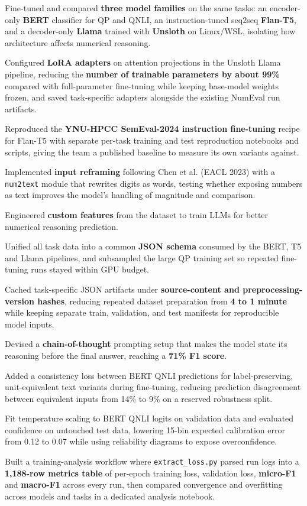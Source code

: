 \documentclass[letterpaper,11pt]{article}
\newcommand{\resumeItem}[1]{
  \item\small{
    {#1 \vspace{-2pt}}
  }
}
\begin{document}
        \resumeItem{Fine-tuned and compared \textbf{three model families} on the same tasks: an encoder-only \textbf{BERT} classifier for QP and QNLI, an instruction-tuned seq2seq \textbf{Flan-T5}, and a decoder-only \textbf{Llama} trained with \textbf{Unsloth} on Linux/WSL, isolating how architecture affects numerical reasoning.}
        \resumeItem{Configured \textbf{LoRA adapters} on attention projections in the Unsloth Llama pipeline, reducing the \textbf{number of trainable parameters by about 99\%} compared with full-parameter fine-tuning while keeping base-model weights frozen, and saved task-specific adapters alongside the existing NumEval run artifacts.}
        \resumeItem{Reproduced the \textbf{YNU-HPCC SemEval-2024 instruction fine-tuning} recipe for Flan-T5 with separate per-task training and test reproduction notebooks and scripts, giving the team a published baseline to measure its own variants against.}
        \resumeItem{Implemented \textbf{input reframing} following Chen et al. (EACL 2023) with a \texttt{num2text} module that rewrites digits as words, testing whether exposing numbers as text improves the model's handling of magnitude and comparison.}
        \resumeItem{Engineered \textbf{custom features} from the dataset to train LLMs for better numerical reasoning prediction.}
        \resumeItem{Unified all task data into a common \textbf{JSON schema} consumed by the BERT, T5 and Llama pipelines, and subsampled the large QP training set so repeated fine-tuning runs stayed within GPU budget.}
        \resumeItem{Cached task-specific JSON artifacts under \textbf{source-content and preprocessing-version hashes}, reducing repeated dataset preparation from \textbf{4 to 1 minute} while keeping separate train, validation, and test manifests for reproducible model inputs.}
        \resumeItem{Devised a \textbf{chain-of-thought} prompting setup that makes the model state its reasoning before the final answer, reaching a \textbf{71\% F1 score}.}
        \resumeItem{Added a consistency loss between BERT QNLI predictions for label-preserving, unit-equivalent text variants during fine-tuning, reducing prediction disagreement between equivalent inputs from 14\% to 9\% on a reserved robustness split.}
        \resumeItem{Fit temperature scaling to BERT QNLI logits on validation data and evaluated confidence on untouched test data, lowering 15-bin expected calibration error from 0.12 to 0.07 while using reliability diagrams to expose overconfidence.}
        \resumeItem{Built a training-analysis workflow where \texttt{extract\_loss.py} parsed run logs into a \textbf{1,188-row metrics table} of per-epoch training loss, validation loss, \textbf{micro-F1} and \textbf{macro-F1} across every run, then compared convergence and overfitting across models and tasks in a dedicated analysis notebook.}
\end{document}
